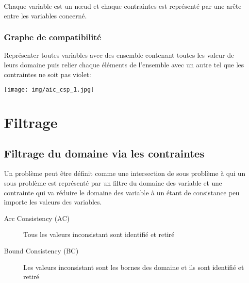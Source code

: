 Chaque variable est un nœud et chaque contraintes est représenté par une arête entre les variables concerné.\\
\begin{center}
\end{center}
\subsection{Graphe de compatibilité}

Représenter toutes variables avec des ensemble contenant toutes les valeur de leurs domaine puis relier chaque éléments de l'ensemble avec un autre tel que les contraintes ne soit pas violet:\\
\begin{center}
\texttt{[image: img/aic\_csp\_1.jpg]} 
\end{center}

\chapter{Filtrage}
\pagebreak
\section{Filtrage du domaine via les contraintes}

Un problème peut être définit comme une intersection de sous problème à qui un sous problème est représenté par un filtre du domaine des variable et une contrainte qui va réduire le domaine des variable à un étant de consistance peu importe les valeurs des variables.\\

\begin{description}
\item[Arc Consistency (AC)] Tous les valeurs inconsistant sont identifié et retiré
\item[Bound Consistency (BC)] Les valeurs inconsistant sont les bornes des domaine et ils sont identifié et retiré
\end{description}

